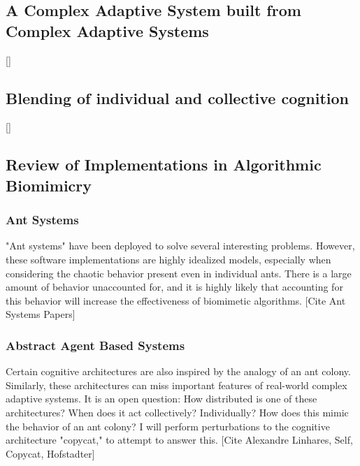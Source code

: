 \documentclass{nature}
\begin{document}
\subsection{A Complex Adaptive System built from Complex Adaptive Systems}
    []
\subsection{Blending of individual and collective cognition}
    []
\subsection{Review of Implementations in Algorithmic Biomimicry}
    \subsubsection{Ant Systems}
        "Ant systems" have been deployed to solve several interesting problems. 
        However, these software implementations are highly idealized models, especially when considering the chaotic behavior present even in individual ants. 
        There is a large amount of behavior unaccounted for, and it is highly likely that accounting for this behavior will increase the effectiveness of biomimetic algorithms.
        [Cite Ant Systems Papers]

    \subsubsection{Abstract Agent Based Systems}
        Certain cognitive architectures are also inspired by the analogy of an ant colony. 
        Similarly, these architectures can miss important features of real-world complex adaptive systems.
        It is an open question: How distributed is one of these architectures? When does it act collectively? Individually? How does this mimic the behavior of an ant colony?
        I will perform perturbations to the cognitive architecture "copycat," to attempt to answer this.
        [Cite Alexandre Linhares, Self, Copycat, Hofstadter]
\end{document}
